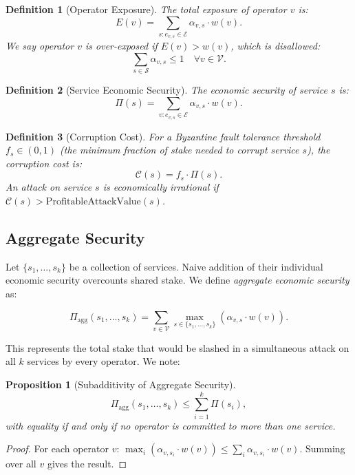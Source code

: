 \documentclass[11pt]{article}
\newtheorem{proposition}[theorem]{Proposition}
\newtheorem{definition}{Definition}
\begin{document}
\begin{definition}[Operator Exposure]
The total exposure of operator $v$ is:
\[
  E(v) = \sum_{s: e_{v,s} \in \mathcal{E}} \alpha_{v,s} \cdot w(v).
\]
We say operator $v$ is \emph{over-exposed} if $E(v) > w(v)$, which is disallowed:
\[
  \sum_{s \in \mathcal{S}} \alpha_{v,s} \leq 1 \quad \forall v \in \mathcal{V}.
\]
\end{definition}

\begin{definition}[Service Economic Security]
The economic security of service $s$ is:
\[
  \Pi(s) = \sum_{v: e_{v,s} \in \mathcal{E}} \alpha_{v,s} \cdot w(v).
\]
\end{definition}

\begin{definition}[Corruption Cost]
For a Byzantine fault tolerance threshold $f_s \in (0,1)$ (the minimum fraction of
stake needed to corrupt service $s$), the \emph{corruption cost} is:
\[
  \mathcal{C}(s) = f_s \cdot \Pi(s).
\]
An attack on service $s$ is economically irrational if $\mathcal{C}(s) > \text{ProfitableAttackValue}(s)$.
\end{definition}

\subsection{Aggregate Security}

Let $\{s_1, \ldots, s_k\}$ be a collection of services. Naive addition of their individual
economic security overcounts shared stake. We define \emph{aggregate economic security} as:

\begin{equation}
\Pi_{\text{agg}}(s_1,\ldots,s_k) = \sum_{v \in \mathcal{V}} \max_{s \in \{s_1,\ldots,s_k\}} (\alpha_{v,s} \cdot w(v)).
\label{eq:aggregate}
\end{equation}

This represents the total stake that would be slashed in a simultaneous attack on all $k$
services by every operator. We note:

\begin{proposition}[Subadditivity of Aggregate Security]
\[
  \Pi_{\text{agg}}(s_1,\ldots,s_k) \leq \sum_{i=1}^k \Pi(s_i),
\]
with equality if and only if no operator is committed to more than one service.
\end{proposition}

\begin{proof}
For each operator $v$: $\max_{i}(\alpha_{v,s_i} \cdot w(v)) \leq \sum_i \alpha_{v,s_i} \cdot w(v)$.
Summing over all $v$ gives the result.
\end{proof}
\end{document}
